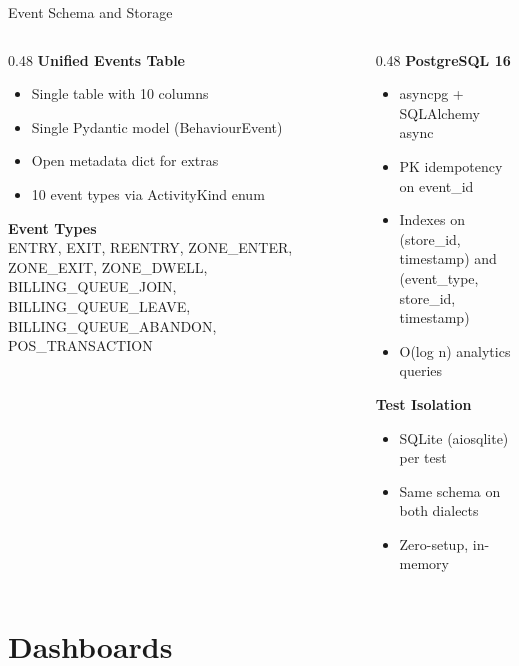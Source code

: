\documentclass[aspectratio=169, 11pt]{beamer}
\begin{document}
\begin{frame}{Event Schema and Storage}
  \begin{columns}[T]
    \begin{column}{0.48\textwidth}
      \textbf{Unified Events Table}
      \begin{itemize}
        \item Single table with 10 columns
        \item Single Pydantic model (BehaviourEvent)
        \item Open metadata dict for extras
        \item 10 event types via ActivityKind enum
      \end{itemize}

      \vspace{0.2cm}
      \textbf{Event Types}\\
      {\small ENTRY, EXIT, REENTRY, ZONE\_ENTER,
      ZONE\_EXIT, ZONE\_DWELL, BILLING\_QUEUE\_JOIN,
      BILLING\_QUEUE\_LEAVE, BILLING\_QUEUE\_ABANDON,
      POS\_TRANSACTION}
    \end{column}
    \begin{column}{0.48\textwidth}
      \textbf{PostgreSQL 16}
      \begin{itemize}
        \item asyncpg + SQLAlchemy async
        \item PK idempotency on event\_id
        \item Indexes on (store\_id, timestamp) and (event\_type, store\_id, timestamp)
        \item O(log n) analytics queries
      \end{itemize}

      \vspace{0.2cm}
      \textbf{Test Isolation}
      \begin{itemize}
        \item SQLite (aiosqlite) per test
        \item Same schema on both dialects
        \item Zero-setup, in-memory
      \end{itemize}
    \end{column}
  \end{columns}
\end{frame}

\section{Dashboards}
\end{document}

